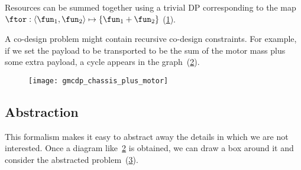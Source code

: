 \begin{example}
    \begin{figure*}[h!]
        \centering
        \caption{\label{fig:gmcdp_chassis_plus_motor_series}}
    \end{figure*}

    Resources can be summed together using a trivial DP corresponding
    to the map $\ftor:\left\langle \fun_{1},\fun_{2}\right\rangle \mapsto\{\fun_{1}+\fun_{2}\}$
    (\cref{fig:total_cost}).

    \begin{figure}
        \centering
        \caption{}
        \label{fig:total_cost}
    \end{figure}



    A co-design problem might contain recursive co-design constraints.
    For example, if we set the payload to be transported to be the sum
    of the motor mass plus some extra payload, a cycle appears in the
    graph~(\cref{fig:gmcdp_chassis_plus_motor}).


    \begin{figure}[h!]
        \centering{}\texttt{[image: gmcdp\_chassis\_plus\_motor]}
        \caption{}
        \label{fig:gmcdp_chassis_plus_motor}
    \end{figure}


        \FloatBarrier \vfill\clearpage
    \subsection{Abstraction}
    This formalism makes it easy to abstract away the details
    in which we are not interested. Once a diagram like~\cref{fig:gmcdp_chassis_plus_motor}
    is obtained, we can draw a box around it and consider the abstracted
    problem~(\cref{fig:gmcdp_chassis_plus_motor-1}).


    \begin{figure}[h!]
        \centering
        \caption{}
        \label{fig:gmcdp_chassis_plus_motor-1}
    \end{figure}


\end{example}
